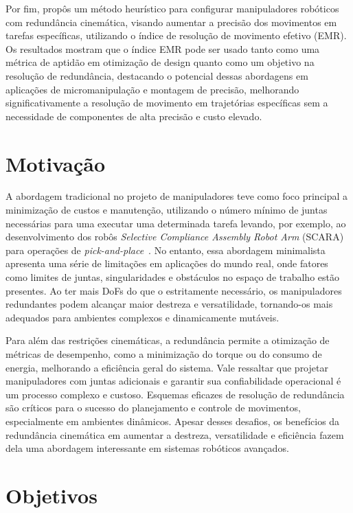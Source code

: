 Por fim, \cite{hammond2011} propôs um método heurístico para configurar manipuladores robóticos com redundância cinemática, visando aumentar a precisão 
dos movimentos em tarefas específicas, utilizando o índice de resolução de movimento efetivo (EMR). Os resultados mostram que o índice EMR pode ser 
usado tanto como uma métrica de aptidão em otimização de design quanto como um objetivo na resolução de redundância,  destacando o potencial dessas
abordagens em aplicações de micromanipulação e montagem de precisão,  melhorando significativamente a resolução de movimento em trajetórias específicas 
sem a necessidade de componentes de alta precisão e custo elevado.

\section{Motivação}\label{sec:motivation}

A abordagem tradicional no projeto de manipuladores teve como foco principal a minimização de custos e manutenção,
utilizando o número mínimo de juntas necessárias para uma executar uma determinada tarefa levando, por exemplo, ao
desenvolvimento dos robôs \emph{Selective Compliance Assembly Robot Arm} (SCARA) para operações de \emph{pick-and-place}~\cite{siciliano_springer_2008}.
No entanto, essa abordagem  minimalista apresenta uma série de limitações em aplicações do mundo real, onde fatores como
limites de juntas, singularidades e obstáculos no espaço de trabalho estão presentes. Ao ter mais DoFs
do que o estritamente necessário, os manipuladores redundantes podem alcançar maior destreza e versatilidade, tornando-os
mais adequados para ambientes complexos e dinamicamente mutáveis.

Para além das restrições cinemáticas, a redundância permite a otimização de métricas de desempenho, como a minimização do torque ou do consumo de energia, melhorando a
eficiência geral do sistema. Vale ressaltar que projetar manipuladores com juntas adicionais e garantir sua confiabilidade operacional é um
processo complexo e custoso. Esquemas eficazes de resolução de redundância são críticos para o sucesso do planejamento e controle de movimentos,
especialmente em ambientes dinâmicos. Apesar desses desafios, os benefícios da redundância cinemática em aumentar a destreza, versatilidade e eficiência
fazem dela uma abordagem interessante em sistemas robóticos avançados.

\section{Objetivos}\label{sec:objectives}

